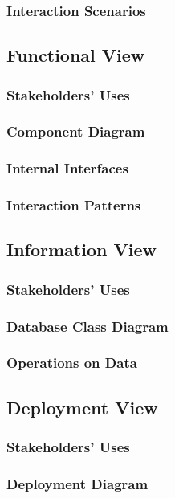 \documentclass[a4paper]{article}
\begin{document}
    \subsubsection{Interaction Scenarios}
    \lipsum[1-1]
    \subsection{Functional View}
    \subsubsection{Stakeholders' Uses}
    \lipsum[1-1]
    \subsubsection{Component Diagram}
    \subsubsection{Internal Interfaces}
    \lipsum[1-1]
    \subsubsection{Interaction Patterns}
    \lipsum[1-1]
    \subsection{Information View}
    \subsubsection{Stakeholders' Uses}
    \lipsum[1-1]
    \subsubsection{Database Class Diagram}
    \subsubsection{Operations on Data}
    \lipsum[1-1]
    \subsection{Deployment View}
    \subsubsection{Stakeholders' Uses}
    \lipsum[1-1]
    \subsubsection{Deployment Diagram}
\end{document}
